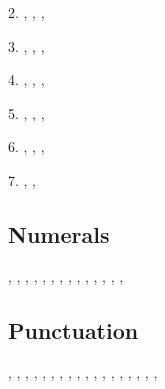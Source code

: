 \documentclass[14pt]{extarticle}
\begin{document}
2. \Ttinco\TTdot, \Ttinco\TTacute, \Ttinco\TTthreedots, \Ttinco\TTrightcurl

3. \Ttinco\TTleftcurl, \Ttinco\TTcaron, \Ttinco\TTbreve, \Ttinco\TTdoubleacute

4. \Ttinco\TTdoublerightcurl, \Ttinco\TTdoubleleftcurl, \Ttinco\TTtwodots, \Ttinco\TTtilde

5. \Ttinco\TTlefttilde, \Ttinco\TTnasalizer, \Ttinco\TTdoubler, \Ttinco\TTdotbelow

6. \Ttinco\TTtwodotsbelow, \Ttinco\TTlefttwodotsbelow, \Ttinco\TTthreedotsbelow, \Ttinco\TTdoubleacutebelow

7. \Ttinco\TTrightcurlbelow, \Ttinco\TTleftcurlbelow, \Ttinco\TTverticalbarbelow

\subsection{Numerals}

\Tzero, \Tone, \Ttwo, \Tthree, \Tfour, \Tfive, \Tsix, \Tseven, \Teight, \Tnine, \Tten, \Televen, \TTdecimal, \TTduodecimal, \TTleastsignificant

\subsection{Punctuation}

\Tcentereddot, \Tcolon, \Tthreeverticaldots, \Tcenteredtilde, \Tcenteredlongtilde, \Texclamation, \Tquestion, \Tparenthesis, \Tromanquestion, \Tromanexclamation, \Tromanperiod, \Tromancomma, \Tromansemicolon, \Tromanquoteleft, \Tromanquoteright, \Tromandblquoteleft, \Tromandblquoteright, \Tromanparenleft, \Tromanparenright
\end{document}
